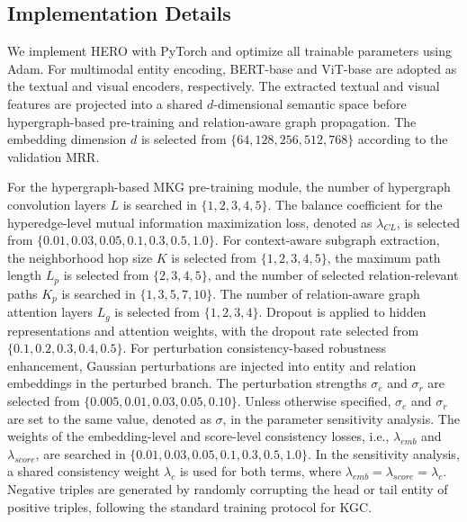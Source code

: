 \documentclass[pdflatex,sn-mathphys-num]{sn-jnl}
\begin{document}
\subsection{Implementation Details}

We implement HERO with PyTorch and optimize all trainable parameters using Adam. For multimodal entity encoding, BERT-base and ViT-base are adopted as the textual and visual encoders, respectively. The extracted textual and visual features are projected into a shared $d$-dimensional semantic space before hypergraph-based pre-training and relation-aware graph propagation. The embedding dimension $d$ is selected from $\{64,128,256,512,768\}$ according to the validation MRR.

For the hypergraph-based MKG pre-training module, the number of hypergraph convolution layers $L$ is searched in $\{1,2,3,4,5\}$. The balance coefficient for the hyperedge-level mutual information maximization loss, denoted as $\lambda_{CL}$, is selected from $\{0.01,0.03,0.05,0.1,0.3,0.5,1.0\}$. For context-aware subgraph extraction, the neighborhood hop size $K$ is selected from $\{1,2,3,4,5\}$, the maximum path length $L_p$ is selected from $\{2,3,4,5\}$, and the number of selected relation-relevant paths $K_p$ is searched in $\{1,3,5,7,10\}$. The number of relation-aware graph attention layers $L_g$ is selected from $\{1,2,3,4\}$. Dropout is applied to hidden representations and attention weights, with the dropout rate selected from $\{0.1,0.2,0.3,0.4,0.5\}$.
For perturbation consistency-based robustness enhancement, Gaussian perturbations are injected into entity and relation embeddings in the perturbed branch. The perturbation strengths $\sigma_e$ and $\sigma_r$ are selected from $\{0.005,0.01,0.03,0.05,0.10\}$. Unless otherwise specified, $\sigma_e$ and $\sigma_r$ are set to the same value, denoted as $\sigma$, in the parameter sensitivity analysis. The weights of the embedding-level and score-level consistency losses, i.e., $\lambda_{emb}$ and $\lambda_{score}$, are searched in $\{0.01,0.03,0.05,0.1,0.3,0.5,1.0\}$. In the sensitivity analysis, a shared consistency weight $\lambda_c$ is used for both terms, where $\lambda_{emb}=\lambda_{score}=\lambda_c$. Negative triples are generated by randomly corrupting the head or tail entity of positive triples, following the standard training protocol for KGC.
\end{document}
